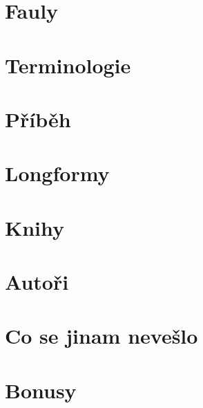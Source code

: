 \documentclass[a4paper,10pt,openany]{book}
\begin{document}
\chapter{Fauly}\label{fauly}

\label{:kategorie:fauly}
 
 

\chapter{Terminologie}\label{terminologie}
\label{:kategorie:terminologie}


\chapter{Příběh}




\chapter{Longformy}\label{longformy}




\chapter{Knihy}\label{knihy}



\chapter{Autoři}\label{autori}


\chapter{Co se jinam nevešlo}\label{co se jinam nevešlo}


\chapter{Bonusy}
\pagebreak
\end{document}
